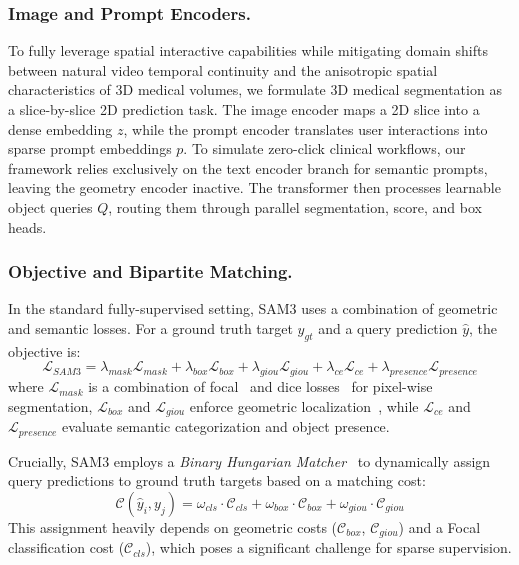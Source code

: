 \documentclass[runningheads]{llncs}
\begin{document}
\subsubsection{Image and Prompt Encoders.}
To fully leverage spatial interactive capabilities while mitigating domain shifts between natural video temporal continuity and the anisotropic spatial characteristics of 3D medical volumes, we formulate 3D medical segmentation as a slice-by-slice 2D prediction task. The image encoder maps a 2D slice into a dense embedding $z$, while the prompt encoder translates user interactions into sparse prompt embeddings $p$. To simulate zero-click clinical workflows, our framework relies exclusively on the text encoder branch for semantic prompts, leaving the geometry encoder inactive. The transformer then processes learnable object queries $Q$, routing them through parallel segmentation, score, and box heads.

\subsubsection{Objective and Bipartite Matching.}
In the standard fully-supervised setting, SAM3 uses a combination of geometric and semantic losses. For a ground truth target $y_{gt}$ and a query prediction $\hat{y}$, the objective is:
\begin{equation}
    \mathcal{L}_{SAM3} = \lambda_{mask} \mathcal{L}_{mask} + \lambda_{box} \mathcal{L}_{box} + \lambda_{giou} \mathcal{L}_{giou} + \lambda_{ce} \mathcal{L}_{ce} + \lambda_{presence} \mathcal{L}_{presence}
\end{equation}
where $\mathcal{L}_{mask}$ is a combination of focal~\cite{Lin2017focal} and dice losses~\cite{milletari2016dice} for pixel-wise segmentation, $\mathcal{L}_{box}$ and $\mathcal{L}_{giou}$ enforce geometric localization~\cite{rezatofighi2019giou}, while $\mathcal{L}_{ce}$ and $\mathcal{L}_{presence}$ evaluate semantic categorization and object presence.

 Crucially, SAM3 employs a \textit{Binary Hungarian Matcher}~\cite{kuhn1955hungarian} to dynamically assign query predictions to ground truth targets based on a matching cost:
\begin{equation}
    \mathcal{C}(\hat{y}_i, y_j) = \omega_{cls} \cdot \mathcal{C}_{cls} + \omega_{box} \cdot \mathcal{C}_{box} + \omega_{giou} \cdot \mathcal{C}_{giou}
\end{equation}
This assignment heavily depends on geometric costs ($\mathcal{C}_{box}$, $\mathcal{C}_{giou}$) and a Focal classification cost ($\mathcal{C}_{cls}$), which poses a significant challenge for sparse supervision.
\end{document}

